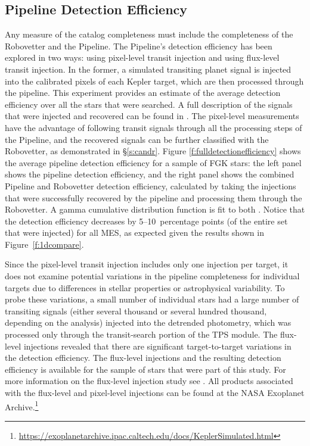 \subsection{Pipeline Detection Efficiency}

Any measure of the catalog completeness must include the completeness of the Robovetter and the \Kepler{} Pipeline. The Pipeline's detection efficiency has been explored in two ways: using pixel-level transit injection and using flux-level transit injection. In the former, a simulated transiting planet signal is injected into the calibrated pixels of each Kepler target, which are then processed through the pipeline. This experiment provides an estimate of the average detection efficiency over all the stars that were searched. A full description of the signals that were injected and recovered can be found in \citet{Christiansen2017}. The pixel-level measurements have the advantage of following transit signals through all the processing steps of the \Kepler{} Pipeline, and the recovered signals can be further classified with the Robovetter, as demonstrated in \S\ref{s:candr}. Figure \ref{f:fulldetectionefficiency} shows the average pipeline detection efficiency for a sample of FGK stars: the left panel shows the pipeline detection efficiency, and the right panel shows the combined Pipeline and Robovetter detection efficiency, calculated by taking the injections that were successfully recovered by the pipeline and processing them through the Robovetter. A gamma cumulative distribution function is fit to both \citep[see equation 1 of ][]{Christiansen2016}.  Notice that the detection efficiency decreases by 5--10~percentage points (of the entire set that were injected) for all MES, as expected given the results shown in Figure~\ref{f:1dcompare}. 



Since the pixel-level transit injection includes only one injection per target, it does not examine potential variations in the pipeline completeness for individual targets due to differences in stellar properties or astrophysical variability. To probe these variations, a small number of individual stars had a large number of transiting signals (either several thousand or several hundred thousand, depending on the analysis) injected into the detrended photometry, which was processed only through the transit-search portion of the TPS module. The flux-level injections revealed that there are significant target-to-target variations in the detection efficiency. The flux-level injections and the resulting detection efficiency is available for the sample of stars that were part of this study. For more information on the flux-level injection study see \citet{Burke2017c}. All products associated with the flux-level and pixel-level injections can be found at the NASA Exoplanet Archive.\footnote{\url{https://exoplanetarchive.ipac.caltech.edu/docs/KeplerSimulated.html}}


